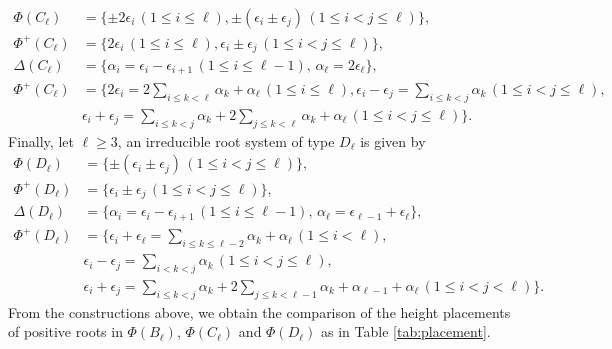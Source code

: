 \documentclass[12pt]{amsart}
\theoremstyle{plain}
\theoremstyle{definition}
\theoremstyle{remark}
\begin{document}
\begin{align*}
\Phi(C_\ell)  &= \{\pm2\epsilon_i \,(1 \le i  \le \ell),\pm(\epsilon_i \pm \epsilon_j)  \,(1 \le i < j \le \ell )\}, \\
\Phi^+(C_\ell)  &= \{2\epsilon_i \,(1 \le i  \le \ell), \epsilon_i \pm \epsilon_j \,(1 \le i < j \le \ell )\}, \\
\Delta(C_\ell) &=\{\alpha_i = \epsilon_i - \epsilon_{i+1}\,(1 \le i  \le \ell-1),\, \alpha_{\ell} =2\epsilon_{\ell} \} ,\\
\Phi^+(C_\ell)  &= \{ 2\epsilon_i=2\sum_{i\le k< \ell }\alpha_k+\alpha_\ell \,(1 \le i \le \ell), \epsilon_i-\epsilon_j=\sum_{i\le k<j }\alpha_k \,(1 \le i < j \le \ell),  \\
& \epsilon_i+\epsilon_j=\sum_{i\le k<j }\alpha_k+2 \sum_{j\le k <\ell }\alpha_k+\alpha_\ell\,(1 \le i < j \le \ell) \}.
\end{align*}
Finally, let $\ell \ge 3$, an irreducible root system of type $D_{\ell}$ is given by
\begin{align*}
\Phi(D_\ell)  &= \{\pm(\epsilon_i \pm \epsilon_j)  \,(1 \le i < j \le \ell )\}, \\
\Phi^+(D_\ell)  &= \{ \epsilon_i \pm \epsilon_j \,(1 \le i < j \le \ell )\}, \\
\Delta(D_\ell) &=\{\alpha_i = \epsilon_i - \epsilon_{i+1}\,(1 \le i  \le \ell-1),\, \alpha_{\ell} =\epsilon_{\ell-1}+\epsilon_{\ell} \},\\
\Phi^+(D_\ell)  &=\{ \epsilon_i + \epsilon_{\ell}=\sum_{i\le k \le \ell-2 }\alpha_k+\alpha_\ell \,(1 \le i< \ell), \\
& \epsilon_i - \epsilon_{j}=\sum_{i< k < j }\alpha_k \,(1 \le i <  j \le \ell), \\
& \epsilon_i + \epsilon_{j}=\sum_{i\le k<j }\alpha_k+2 \sum_{j\le k <\ell-1 }\alpha_k+\alpha_{\ell-1}+\alpha_\ell\,(1 \le i < j< \ell) \}.
\end{align*}
From the constructions above, we obtain the comparison of the height placements of positive roots in $\Phi(B_\ell)$, $\Phi(C_\ell)$ and $\Phi(D_\ell)$ as in Table \ref{tab:placement}.
\end{document}

